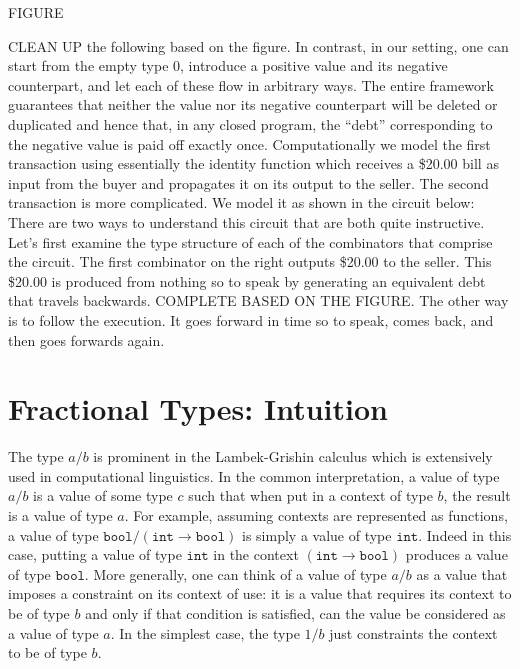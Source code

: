\documentclass[preprint]{sigplanconf}
\begin{document}
FIGURE

CLEAN UP the following based on the figure. In contrast, in our setting, one
can start from the empty type $0$, introduce a positive value and its
negative counterpart, and let each of these flow in arbitrary ways. The
entire framework guarantees that neither the value nor its negative
counterpart will be deleted or duplicated and hence that, in any closed
program, the ``debt'' corresponding to the negative value is paid off exactly
once. Computationally we model the first transaction using essentially the
identity function which receives a \$20.00 bill as input from the buyer and
propagates it on its output to the seller. The second transaction is more
complicated. We model it as shown in the circuit below: There are two ways to
understand this circuit that are both quite instructive. Let's first examine
the type structure of each of the combinators that comprise the circuit. The
first combinator on the right outputs \$20.00 to the seller. This \$20.00 is
produced from nothing so to speak by generating an equivalent debt that
travels backwards. COMPLETE BASED ON THE FIGURE. The other way is to follow
the execution. It goes forward in time so to speak, comes back, and then goes
forwards again.

\section{Fractional Types: Intuition} 

The type $a/b$ is prominent in the Lambek-Grishin calculus which is
extensively used in computational linguistics. In the common interpretation,
a value of type $a/b$ is a value of some type $c$ such that when put in a
context of type $b$, the result is a value of type $a$. For example, assuming
contexts are represented as functions, a value of type $\texttt{bool} /
(\texttt{int} \rightarrow \texttt{bool})$ is simply a value of type
$\texttt{int}$. Indeed in this case, putting a value of type $\texttt{int}$
in the context $(\texttt{int} \rightarrow \texttt{bool})$ produces a value of
type $\texttt{bool}$. More generally, one can think of a value of type $a/b$
as a value that imposes a constraint on its context of use: it is a value
that requires its context to be of type $b$ and only if that condition is
satisfied, can the value be considered as a value of type $a$. In the
simplest case, the type $1/b$ just constraints the context to be of type $b$.
\end{document}

